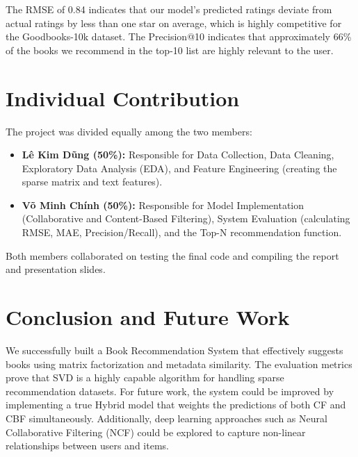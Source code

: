 \documentclass[12pt]{article}
\begin{document}
The RMSE of 0.84 indicates that our model's predicted ratings deviate from actual ratings by less than one star on average, which is highly competitive for the Goodbooks-10k dataset. The Precision@10 indicates that approximately 66\% of the books we recommend in the top-10 list are highly relevant to the user.

\section{Individual Contribution}
The project was divided equally among the two members:
\begin{itemize}
    \item \textbf{Lê Kim Dũng (50\%):} Responsible for Data Collection, Data Cleaning, Exploratory Data Analysis (EDA), and Feature Engineering (creating the sparse matrix and text features).
    \item \textbf{Võ Minh Chính (50\%):} Responsible for Model Implementation (Collaborative and Content-Based Filtering), System Evaluation (calculating RMSE, MAE, Precision/Recall), and the Top-N recommendation function.
\end{itemize}
Both members collaborated on testing the final code and compiling the report and presentation slides.

\section{Conclusion and Future Work}
We successfully built a Book Recommendation System that effectively suggests books using matrix factorization and metadata similarity. The evaluation metrics prove that SVD is a highly capable algorithm for handling sparse recommendation datasets. 
For future work, the system could be improved by implementing a true Hybrid model that weights the predictions of both CF and CBF simultaneously. Additionally, deep learning approaches such as Neural Collaborative Filtering (NCF) could be explored to capture non-linear relationships between users and items.
\end{document}
